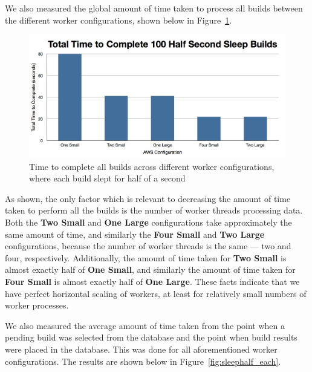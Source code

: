 \documentclass{scrartcl}
\begin{document}
We also measured the global amount of time taken to process all builds between the different worker configurations, shown below in Figure~\ref{fig:sleephalf_all}.

\begin{figure}[here]
  \begin{center}
    \includegraphics[scale=0.45]{raw_data/sleep0.5/time_to_complete_all.jpg}
  \end{center}
  \caption{Time to complete all builds across different worker configurations, where each build slept for half of a second}
  \label{fig:sleephalf_all}
\end{figure}

As shown, the only factor which is relevant to decreasing the amount of time taken to perform all the builds is the number of worker threads processing data.
Both the \textbf{Two Small} and \textbf{One Large} configurations take approximately the same amount of time, and similarly the \textbf{Four Small} and \textbf{Two Large} configurations, because the number of worker threads is the same --- two and four, respectively.
Additionally, the amount of time taken for \textbf{Two Small} is almost exactly half of \textbf{One Small}, and similarly the amount of time taken for \textbf{Four Small} is almost exactly half of \textbf{One Large}.
These facts indicate that we have perfect horizontal scaling of workers, at least for relatively small numbers of worker processes.

We also measured the average amount of time taken from the point when a pending build was selected from the database and the point when build results were placed in the database.
This was done for all aforementioned worker configurations.
The results are shown below in Figure~\ref{fig:sleephalf_each}.
\end{document}
